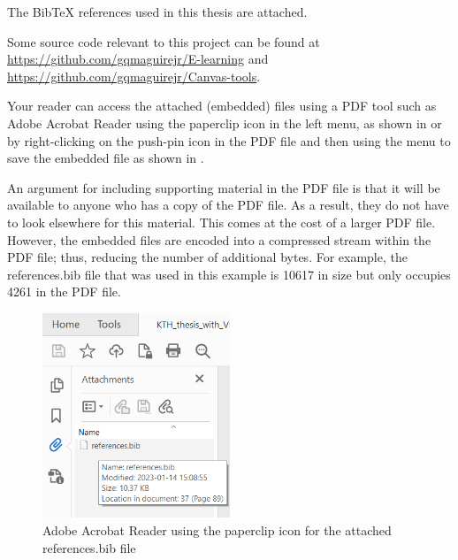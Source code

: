 \documentclass[nomenclature, english, bibtex]{kththesis}
\begin{document}
The BibTeX references used in this thesis are attached. 

Some source code relevant to this project can be found at \url{https://github.com/gqmaguirejr/E-learning} and \url{https://github.com/gqmaguirejr/Canvas-tools}.

Your reader can access the attached (embedded) files using a PDF tool such as Adobe Acrobat Reader using the paperclip icon in the left menu, as shown in  or by right-clicking on the push-pin icon in the PDF file and then using the menu to save the embedded file as shown in .

An argument for including supporting material in the PDF file is that it will be available to anyone who has a copy of the PDF file. As a result, they do not have to look elsewhere for this material. This comes at the cost of a larger PDF file. However, the embedded files are encoded into a compressed stream within the PDF file; thus, reducing the number of additional bytes. For example, the references.bib file that was used in this example is \SI{10617}{\byte} in size but only occupies \SI{4261}{\byte} in the PDF file.


\begin{figure}[!ht]
  \begin{center}
    \includegraphics[width=0.50\textwidth]{README_notes/pdf-viewer-attached-files.png}
  \end{center}
  \caption{Adobe Acrobat Reader using the paperclip icon for the attached references.bib file}
  \label{fig:PDFreaderPaperclipExample}
\end{figure}
\FloatBarrier
\end{document}
